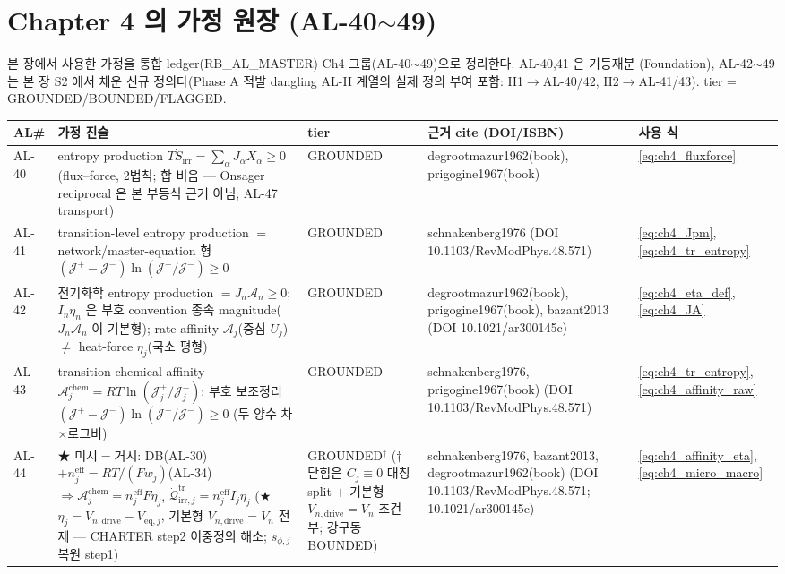 \documentclass[11pt,a4paper]{article}
\newcommand{\eff}{\mathrm{eff}}
\newcommand{\eq}{\mathrm{eq}}
\newcommand{\drive}{\mathrm{drive}}
\newcommand{\irr}{\mathrm{irr}}
\newcommand{\tr}{\mathrm{tr}}
\newcommand{\chem}{\mathrm{chem}}
\newcommand{\brk}{\discretionary{}{}{}}%
\begin{document}
\section{Chapter 4 의 가정 원장 (AL-40$\sim$49)}\label{sec:ch4_al}
본 장에서 사용한 가정을 통합 ledger(RB\_AL\_MASTER) Ch4 그룹(AL-40$\sim$49)으로 정리한다. AL-40,41 은 기등재분
(Foundation), AL-42$\sim$49 는 본 장 S2 에서 채운 신규 정의다(Phase A 적발 dangling AL-H 계열의 실제 정의 부여
포함: H1$\to$AL-40/42, H2$\to$AL-41/43). tier = GROUNDED/BOUNDED/FLAGGED.
{\footnotesize
\setlength{\tabcolsep}{3pt}
\sloppy
\begin{longtable}{>{\raggedright\arraybackslash}p{} >{\raggedright\arraybackslash}p{} >{\raggedright\arraybackslash}p{} >{\raggedright\arraybackslash}p{} >{\raggedright\arraybackslash}p{}}
\toprule AL\# & 가정 진술 & tier & 근거 cite (DOI/ISBN) & 사용 식 \\ \midrule \endhead
AL-40 & entropy production $T\dot S_\irr=\sum_\alpha J_\alpha X_\alpha\ge0$ (flux--force, 2법칙; 합 비음 — Onsager reciprocal 은 본 부등식 근거 아님, AL-47 transport) & GROUNDED & degrootmazur1962(book), prigogine1967(book) & \eqref{eq:ch4_fluxforce} \\
AL-41 & transition-level entropy production $=$ network/master-equation 형 $(\mathcal J^+{-}\mathcal J^-)\ln(\mathcal J^+/\mathcal J^-)\ge0$ & GROUNDED & schnakenberg1976 (DOI 10.1103/\brk RevModPhys.48.571) & \eqref{eq:ch4_Jpm},\allowbreak\eqref{eq:ch4_tr_entropy} \\
AL-42 & 전기화학 entropy production $=J_n\mathcal A_n\ge0$; $I_n\eta_n$ 은 부호 convention 종속 magnitude($J_n\mathcal A_n$ 이 기본형); rate-affinity $\mathcal A_j$(중심 $U_j$) $\ne$ heat-force $\eta_j$(국소 평형) & GROUNDED & degrootmazur1962(book), prigogine1967(book), bazant2013 (DOI 10.1021/\brk ar300145c) & \eqref{eq:ch4_eta_def},\allowbreak\eqref{eq:ch4_JA} \\
AL-43 & transition chemical affinity $\mathcal A_j^{\chem}=RT\ln(\mathcal J_j^+/\mathcal J_j^-)$; 부호 보조정리 $(\mathcal J^+{-}\mathcal J^-)\ln(\mathcal J^+/\mathcal J^-)\ge0$ (두 양수 차×로그비) & GROUNDED & schnakenberg1976, prigogine1967(book) (DOI 10.1103/\brk RevModPhys.48.571) & \eqref{eq:ch4_tr_entropy},\allowbreak\eqref{eq:ch4_affinity_raw} \\
AL-44 & ★ 미시$=$거시: DB(AL-30)$+n_j^\eff{=}RT/(Fw_j)$(AL-34) $\Rightarrow\mathcal A_j^{\chem}{=}n_j^\eff F\eta_j$, $\dot{\mathcal Q}_{\irr,j}^{\tr}{=}n_j^\eff I_j\eta_j$ (★ $\eta_j{=}V_{n,\drive}{-}V_{\eq,j}$, 기본형 $V_{n,\drive}{=}V_n$ 전제 — CHARTER step2 이중정의 해소; $s_{\phi,j}$ 복원 step1) & GROUNDED$^\dagger$ ($\dagger$ 닫힘은 $C_j{\equiv}0$ 대칭 split $+$ 기본형 $V_{n,\drive}{=}V_n$ 조건부; 강구동 BOUNDED) & schnakenberg1976, bazant2013, degrootmazur1962(book) (DOI 10.1103/\brk RevModPhys.48.571; 10.1021/\brk ar300145c) & \eqref{eq:ch4_affinity_eta},\allowbreak\eqref{eq:ch4_micro_macro} \\

\end{longtable}}
\end{document}
